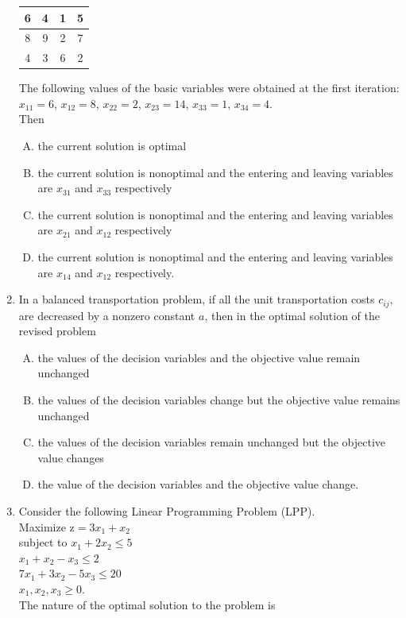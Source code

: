 \documentclass[journal,12pt,twocolumn]{IEEEtran}
\begin{document}
\begin{enumerate}
\begin{tabular}{|c|c|c|c|} \hline
6 & 4 & 1 & 5 \\ \hline
8 & 9 & 2 & 7 \\ \hline
4 & 3 & 6 & 2 \\ \hline
\end{tabular}
\medskip
The following values of the basic variables were obtained at the first iteration: \\ \smallskip
$x_{11} \! = \! 6$, $x_{12} \! = \! 8$, $x_{22} \! = \! 2$, $x_{23} \! = \! 14$, $x_{33} \! = \! 1$, $x_{34} \! = \! 4$. \\
\smallskip
Then \\
\begin{enumerate}[(A)]
\setlength\itemsep{1em}
\item the current solution is optimal
\item the current solution is nonoptimal and the entering and leaving variables are $x_{31}$ and $x_{33}$ respectively
\item the current solution is nonoptimal and the entering and leaving variables are $x_{21}$ and $x_{12}$ respectively
\item the current solution is nonoptimal and the entering and leaving variables are $x_{14}$ and $x_{12}$ respectively.
\end{enumerate}

\item In a balanced transportation problem, if all the unit transportation costs $c_{ij}$, are decreased by a nonzero constant $a$, then in the optimal solution of the revised problem \\
\begin{enumerate}[(A)]
\setlength\itemsep{1em}
\item the values of the decision variables and the objective value remain unchanged
\item the values of the decision variables change but the objective value remains unchanged
\item the values of the decision variables remain unchanged but the objective value changes
\item the value of the decision variables and the objective value change.
\end{enumerate}

\item Consider the following Linear Programming Problem (LPP).\\
Maximize $\text{z} \! = \! 3x_1 \! + \! x_2$ \\
subject to $x_1 \! + \! 2x_2 \! \leqslant \! 5$\\
$x_1 \! + \! x_2 \! - \! x_3 \! \leqslant \! 2$\\
$7x_1 \! + \! 3x_2 \! - \! 5x_3 \! \leqslant \! 20$\\
$x_1, \! x_2, \! x_3 \! \geqslant \! 0$. \\
\smallskip
The nature of the optimal solution to the problem is
\begin{enumerate}[(A)]
\begin{multicols}{2}
\setlength\itemsep{1em}


\end{multicols}
\end{enumerate}
\end{enumerate}
\end{document}
